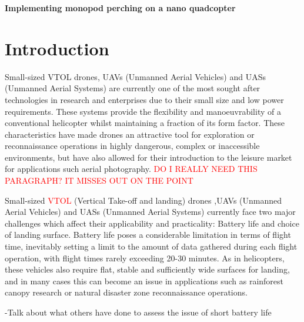 \documentclass[12pt,a4paper]{article}
\begin{document}
\begin{titlepage}
	\begin{center}
	\Huge{\textbf{Implementing monopod perching on a nano quadcopter}}
	\end{center}
\end{titlepage}




\tableofcontents

\pagebreak

\listoffigures

\pagebreak

\listoftables

\pagebreak

\setcounter{page}{1}
\section{Introduction}
Small-sized VTOL drones, UAVs (Unmanned Aerial Vehicles) and UASs (Unmanned Aerial Systems) are currently one of the most sought after technologies in research and enterprises due to their small size and low power requirements. These systems provide the flexibility and manoeuvrability of a conventional helicopter whilst maintaining a fraction of its form factor. These characteristics have made drones an attractive tool for exploration or reconnaissance operations in highly dangerous, complex or inaccessible environments, but have also allowed for their introduction to the leisure market for applications such aerial photography. \textcolor{red}{DO I REALLY NEED THIS PARAGRAPH? IT MISSES OUT ON THE POINT}

Small-sized \textcolor{red}{VTOL} (Vertical Take-off and landing) drones ,UAVs (Unmanned Aerial Vehicles) and UASs (Unmanned Aerial Systems) currently face two major challenges which affect their applicability and practicality: Battery life and choice of landing surface. Battery life poses a considerable limitation in terms of flight time, inevitably setting a limit to the amount of data gathered during each flight operation, with flight times rarely exceeding 20-30 minutes. As in helicopters, these vehicles also require flat, stable and sufficiently wide surfaces for landing, and in many cases this can become an issue in applications such as rainforest canopy research or natural disaster zone reconnaissance operations.

-Talk about what others have done to assess the issue of short battery life
	
\end{document}
